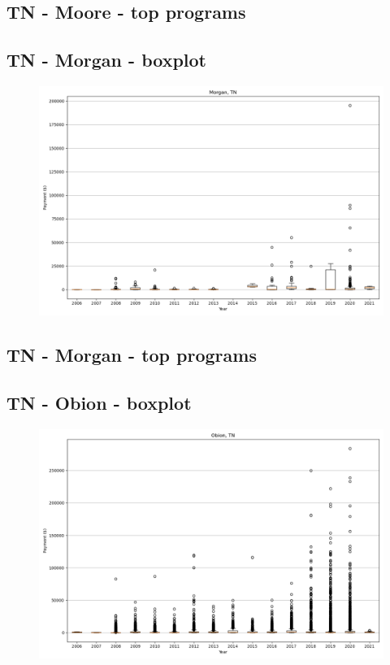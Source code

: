 \subsection*{TN - Moore - top programs}

\newpage
\subsection*{TN - Morgan - boxplot}
\begin{figure}[h]
\centering
\includegraphics[width=7in]{../output/boxplots/counties/Morgan-TN_boxplot.png}
\end{figure}


\subsection*{TN - Morgan - top programs}

\newpage
\subsection*{TN - Obion - boxplot}
\begin{figure}[h]
\centering
\includegraphics[width=7in]{../output/boxplots/counties/Obion-TN_boxplot.png}
\end{figure}


